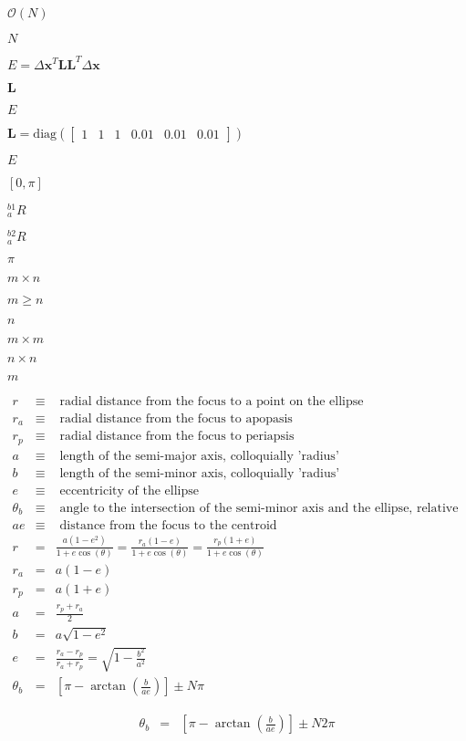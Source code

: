 \documentclass{article}
\begin{document}
$ \mathcal{O}(N) $
\pagebreak

$N$
\pagebreak

$ E = \Delta \mathbf{x}^T \mathbf{L} \mathbf{L}^T \Delta \mathbf{x} $
\pagebreak

$\mathbf{L}$
\pagebreak

$E$
\pagebreak

$\mathbf{L} = \mathrm{diag}\left( \begin{bmatrix} 1 & 1 & 1 & 0.01 & 0.01 & 0.01 \end{bmatrix} \right) $
\pagebreak

$ E $
\pagebreak

$ [0 , \pi] $
\pagebreak

$ _a^{b1} R $
\pagebreak

$ _a^{b2} R $
\pagebreak

$ \pi $
\pagebreak

$m \times n$
\pagebreak

$ m \geq n $
\pagebreak

$n$
\pagebreak

$m \times m$
\pagebreak

$n \times n$
\pagebreak

$m$
\pagebreak

\begin{eqnarray*} r &\equiv& \textrm{ radial distance from the focus to a point on the ellipse}\\ r_a &\equiv& \textrm{ radial distance from the focus to apopasis}\\ r_p &\equiv& \textrm{ radial distance from the focus to periapsis}\\ a &\equiv& \textrm{ length of the semi-major axis, colloquially 'radius'}\\ b &\equiv& \textrm{ length of the semi-minor axis, colloquially 'radius'}\\ e &\equiv& \textrm{ eccentricity of the ellipse}\\ \theta_b &\equiv& \textrm{ angle to the intersection of the semi-minor axis and the ellipse, relative to the focus}\\ ae &\equiv& \textrm{ distance from the focus to the centroid}\\ r &=& \frac{a(1-e^2)}{1+e\cos(\theta)} = \frac{r_a(1-e)}{1+e\cos(\theta)} = \frac{r_p(1+e)}{1+e\cos(\theta)}\\ r_a &=& a(1-e)\\ r_p &=& a(1+e)\\ a &=& \frac{r_p+r_a}{2}\\ b &=& a\sqrt{1-e^2}\\ e &=& \frac{r_a-r_p}{r_a+r_p} = \sqrt{1-\frac{b^2}{a^2}}\\ \theta_b &=& \left[\pi - \arctan\left(\frac{b}{ae}\right)\right] \pm N\pi \end{eqnarray*}
\pagebreak

\begin{eqnarray*} \theta_b &=& \left[\pi - \arctan\left(\frac{b}{ae}\right)\right] \pm N 2\pi \end{eqnarray*}
\pagebreak
\end{document}
